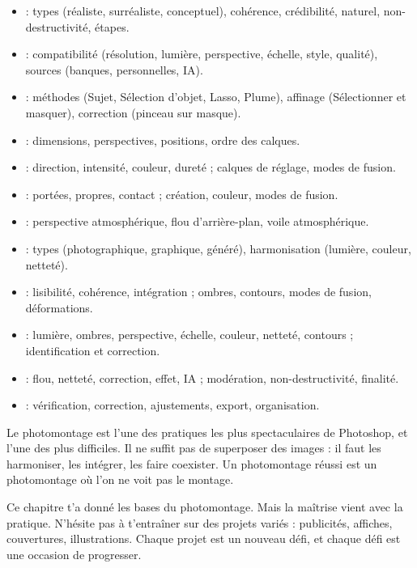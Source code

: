 \begin{itemize}
    \item {} : types (réaliste, surréaliste, conceptuel), cohérence, crédibilité, naturel, non-destructivité, étapes.
    \item {} : compatibilité (résolution, lumière, perspective, échelle, style, qualité), sources (banques, personnelles, IA).
    \item {} : méthodes (Sujet, Sélection d'objet, Lasso, Plume), affinage (Sélectionner et masquer), correction (pinceau sur masque).
    \item {} : dimensions, perspectives, positions, ordre des calques.
    \item {} : direction, intensité, couleur, dureté ; calques de réglage, modes de fusion.
    \item {} : portées, propres, contact ; création, couleur, modes de fusion.
    \item {} : perspective atmosphérique, flou d'arrière-plan, voile atmosphérique.
    \item {} : types (photographique, graphique, généré), harmonisation (lumière, couleur, netteté).
    \item {} : lisibilité, cohérence, intégration ; ombres, contours, modes de fusion, déformations.
    \item {} : lumière, ombres, perspective, échelle, couleur, netteté, contours ; identification et correction.
    \item {} : flou, netteté, correction, effet, IA ; modération, non-destructivité, finalité.
    \item {} : vérification, correction, ajustements, export, organisation.
\end{itemize}

Le photomontage est l'une des pratiques les plus spectaculaires de Photoshop, et l'une des plus difficiles. Il ne suffit pas de superposer des images : il faut les harmoniser, les intégrer, les faire coexister. Un photomontage réussi est un photomontage où l'on ne voit pas le montage.

Ce chapitre t'a donné les bases du photomontage. Mais la maîtrise vient avec la pratique. N'hésite pas à t'entraîner sur des projets variés : publicités, affiches, couvertures, illustrations. Chaque projet est un nouveau défi, et chaque défi est une occasion de progresser.

